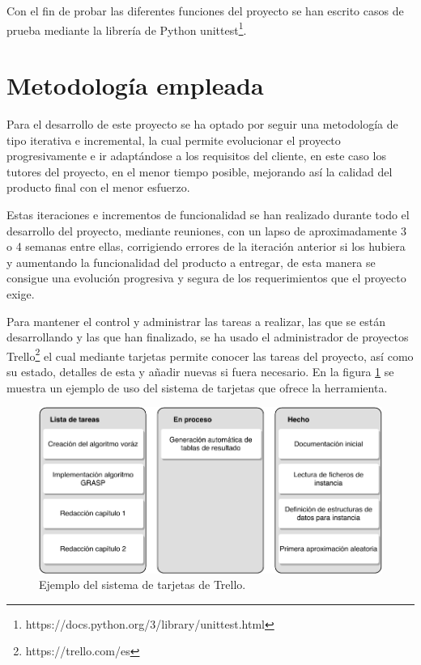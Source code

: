 Con el fin de probar las diferentes funciones del proyecto se han escrito casos de prueba mediante la librería de Python unittest\footnote{https://docs.python.org/3/library/unittest.html}.

\section{Metodología empleada}
Para el desarrollo de este proyecto se ha optado por seguir una metodología de tipo iterativa e incremental, la cual permite evolucionar el proyecto progresivamente e ir adaptándose a los requisitos del cliente, en este caso los tutores del proyecto, en el menor tiempo posible, mejorando así la calidad del producto final con el menor esfuerzo.

Estas iteraciones e incrementos de funcionalidad se han realizado durante todo el desarrollo del proyecto, mediante reuniones, con un lapso de aproximadamente 3 o 4 semanas entre ellas, corrigiendo errores de la iteración anterior si los hubiera y aumentando la funcionalidad del producto a entregar, de esta manera se consigue una evolución progresiva y segura de los requerimientos que el proyecto exige.

Para mantener el control y administrar las tareas a realizar, las que se están desarrollando y las que han finalizado, se ha usado el administrador de proyectos Trello\footnote{https://trello.com/es} el cual mediante tarjetas permite conocer las tareas del proyecto, así como su estado, detalles de esta y añadir nuevas si fuera necesario. En la figura \ref{fig:trello-tarjetas} se muestra un ejemplo de uso del sistema de tarjetas que ofrece la herramienta.

\begin{figure}[H]
	\centering
	\includegraphics{Figures/trello-tarjetas.pdf}
	\caption{Ejemplo del sistema de tarjetas de Trello.}
	\label{fig:trello-tarjetas}
\end{figure}

